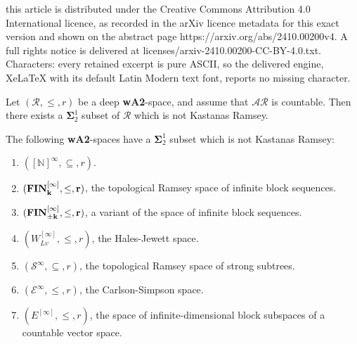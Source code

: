 \documentclass[10pt,a4paper]{amsart}
\newcommand{\E}{\cal{E}}
\newcommand{\FIN}{\bf{FIN}}
\newcommand{\N}{\mathbb{N}}
\newcommand{\cal}{\mathcal}
\begin{document}
this article is distributed under the Creative Commons Attribution 4.0 International licence, as recorded in the arXiv licence metadata for this exact version and shown on the abstract page https://arxiv.org/abs/2410.00200v4. A full rights notice is delivered at licenses/arxiv-2410.00200-CC-BY-4.0.txt. Characters: every retained excerpt is pure ASCII, so the delivered engine, XeLaTeX with its default Latin Modern text font, reports no missing character.
\begin{corollary}[$\mathsf{V=L}$]
\label{cor:V=L.gives.non.kr.set}
    Let $(\cal{R},\leq,r)$ be a deep \textbf{wA2}-space, and assume that $\cal{AR}$ is countable. Then there exists a $\mathbf{\Sigma}_2^1$ subset of $\cal{R}$ which is not Kastanas Ramsey.
\end{corollary}

\begin{corollary}[$\mathsf{V=L}$]
\label{cor:V=L.gives.non.kr.set.in.examples}
    The following \textbf{wA2}-spaces have a $\mathbf{\Sigma}_2^1$ subset which is not Kastanas Ramsey:
    \begin{enumerate}
        \item $([\N]^\infty,\subseteq,r)$.

        \item $(\FIN_k^{[\infty]},\leq,r)$, the topological Ramsey space of infinite block sequences.
        
        \item $(\FIN_{\pm k}^{[\infty]},\leq,r)$, a variant of the space of infinite block sequences.

        \item $(W_{Lv}^{[\infty]},\leq,r)$, the Hales-Jewett space.

        \item $(\mathcal{S}^\infty,\subseteq,r)$, the topological Ramsey space of strong subtrees.

        \item $(\E^\infty,\leq,r)$, the Carlson-Simpson space.

        \item $(E^{[\infty]},\leq,r)$, the space of infinite-dimensional block subspaces of a countable vector space.
    \end{enumerate}
\end{corollary}
\end{document}
